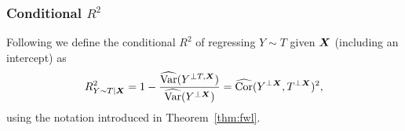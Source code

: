 \documentclass[11pt]{exam}
\begin{document}
\subsubsection{Conditional $R^2$}
Following \citet{cinelli2020making} we define the conditional $R^2$ of regressing $Y \sim T$ given $\bm{X}$ (including an intercept) as
\[
    R_{Y \sim T \mid \bm{X}}^2 = 1 - \frac{\widehat{\mathrm{Var}}(Y^{\perp T, \bm{X}})}{\widehat{\mathrm{Var}}(Y^{\perp \bm{X}})} = \widehat{\mathrm{Cor}}(Y^{\perp \bm{X}}, T^{\perp \bm{X}})^2,
\]
using the notation introduced in Theorem~\ref{thm:fwl}.
\endgroup

\newpage


\end{document}
